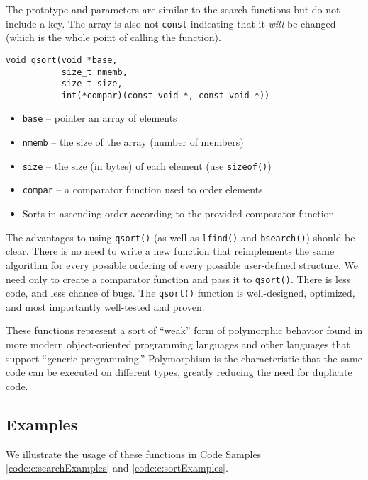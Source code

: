 The prototype and parameters are similar to the search functions but do not
include a key.  The array is also not \texttt{const} indicating that
it \emph{will} be changed (which is the whole point of calling the function).

\begin{verbatim}
void qsort(void *base, 
           size_t nmemb, 
           size_t size, 
           int(*compar)(const void *, const void *))
\end{verbatim}           

\begin{itemize}
  \item \texttt{base} -- pointer an array of elements
  \item \texttt{nmemb} -- the size of the array (number of members)
  \item \texttt{size} -- the size (in bytes) of each element (use \texttt{sizeof()})
  \item \texttt{compar} -- a comparator function used to order elements
  \item Sorts in ascending order according to the provided comparator function
\end{itemize}

The advantages to using \texttt{qsort()} (as well as \texttt{lfind()} 
and \texttt{bsearch()}) should be clear.  There is no need to write a 
new function that reimplements the same algorithm for every possible ordering of
every possible user-defined structure.  We need only to create a comparator
function and pass it to \texttt{qsort()}.  There is less code, and less
chance of bugs.  The \texttt{qsort()} function is well-designed, 
optimized, and most importantly well-tested and proven.

These functions represent a sort of ``weak'' form of polymorphic behavior found
in more modern object-oriented programming languages and other languages that
support ``generic programming.''  Polymorphism is the characteristic that
the same code can be executed on different types, greatly reducing the need
for duplicate code.

\subsection{Examples}

We illustrate the usage of these functions in Code Samples 
\ref{code:c:searchExamples} and \ref{code:c:sortExamples}.

